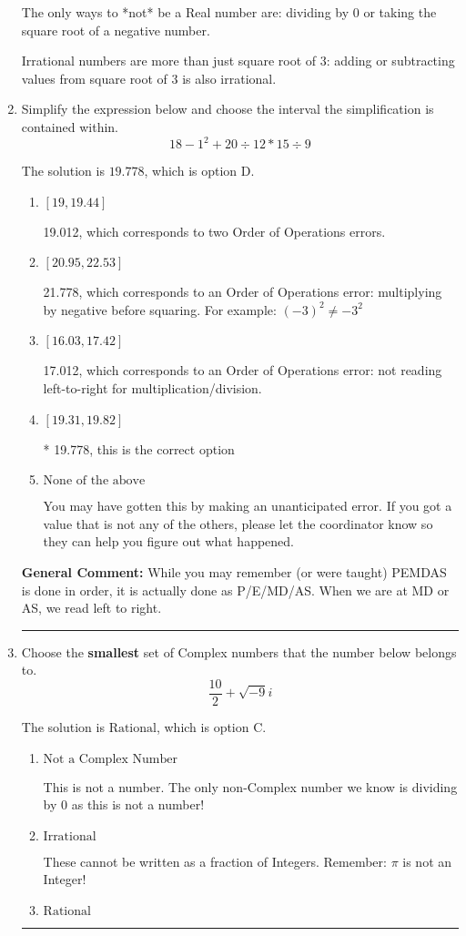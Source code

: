 \documentclass{extbook}[14pt]
\newcommand{\litem}[1]{\item #1

\rule{\textwidth}{0.4pt}}
\begin{document}
\begin{enumerate}
{ The only ways to *not* be a Real number are: dividing by 0 or taking the square root of a negative number. 
 
 Irrational numbers are more than just square root of 3: adding or subtracting values from square root of 3 is also irrational.
}
\litem{
Simplify the expression below and choose the interval the simplification is contained within.
\[ 18 - 1^2 + 20 \div 12 * 15 \div 9 \]

The solution is \( 19.778 \), which is option D.\begin{enumerate}[label=\Alph*.]
\item \( [19, 19.44] \)

 19.012, which corresponds to two Order of Operations errors.
\item \( [20.95, 22.53] \)

 21.778, which corresponds to an Order of Operations error: multiplying by negative before squaring. For example: $(-3)^2 \neq -3^2$
\item \( [16.03, 17.42] \)

 17.012, which corresponds to an Order of Operations error: not reading left-to-right for multiplication/division.
\item \( [19.31, 19.82] \)

* 19.778, this is the correct option
\item \( \text{None of the above} \)

 You may have gotten this by making an unanticipated error. If you got a value that is not any of the others, please let the coordinator know so they can help you figure out what happened.
\end{enumerate}

\textbf{General Comment:} While you may remember (or were taught) PEMDAS is done in order, it is actually done as P/E/MD/AS. When we are at MD or AS, we read left to right.
}
\litem{
Choose the \textbf{smallest} set of Complex numbers that the number below belongs to.
\[ \frac{10}{2}+\sqrt{-9}i \]

The solution is \( \text{Rational} \), which is option C.\begin{enumerate}[label=\Alph*.]
\item \( \text{Not a Complex Number} \)

This is not a number. The only non-Complex number we know is dividing by 0 as this is not a number!
\item \( \text{Irrational} \)

These cannot be written as a fraction of Integers. Remember: $\pi$ is not an Integer!
\item \( \text{Rational} \)


\end{enumerate}}
\end{enumerate}
\end{document}
